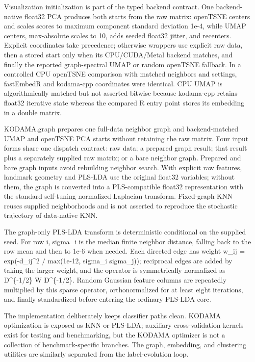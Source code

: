 \documentclass[twoside,11pt]{article}
\begin{document}
\begin{small}
Visualization initialization is part of the typed backend contract. One backend-native float32 PCA produces both starts from the raw matrix: openTSNE centers and scales scores to maximum component standard deviation 1e-4, while UMAP centers, max-absolute scales to 10, adds seeded float32 jitter, and recenters. Explicit coordinates take precedence; otherwise wrappers use explicit raw data, then a stored start only when its CPU/CUDA/Metal backend matches, and finally the reported graph-spectral UMAP or random openTSNE fallback. In a controlled CPU openTSNE comparison with matched neighbors and settings, fastEmbedR and kodama-cpp coordinates were identical. CPU UMAP is algorithmically matched but not asserted bitwise because kodama-cpp retains float32 iterative state whereas the compared R entry point stores its embedding in a double matrix.

KODAMA.graph prepares one full-data neighbor graph and backend-matched UMAP and openTSNE PCA starts without retaining the raw matrix. Four input forms share one dispatch contract: raw data; a prepared graph result; that result plus a separately supplied raw matrix; or a bare neighbor graph. Prepared and bare graph inputs avoid rebuilding neighbor search. With explicit raw features, landmark geometry and PLS-LDA use the original float32 variables; without them, the graph is converted into a PLS-compatible float32 representation with the standard self-tuning normalized Laplacian transform. Fixed-graph KNN reuses supplied neighborhoods and is not asserted to reproduce the stochastic trajectory of data-native KNN.

The graph-only PLS-LDA transform is deterministic conditional on the supplied seed. For row i, sigma\_i is the median finite neighbor distance, falling back to the row mean and then to 1e-6 when needed. Each directed edge has weight w\_ij = exp(-d\_ij\textasciicircum{}2 / max(1e-12, sigma\_i sigma\_j)); reciprocal edges are added by taking the larger weight, and the operator is symmetrically normalized as D\textasciicircum{}\{-1/2\} W D\textasciicircum{}\{-1/2\}. Random Gaussian feature columns are repeatedly multiplied by this sparse operator, orthonormalized for at least eight iterations, and finally standardized before entering the ordinary PLS-LDA core.

The implementation deliberately keeps classifier paths clean. KODAMA optimization is exposed as KNN or PLS-LDA; auxiliary cross-validation kernels exist for testing and benchmarking, but the KODAMA optimizer is not a collection of benchmark-specific branches. The graph, embedding, and clustering utilities are similarly separated from the label-evolution loop.


\end{small}
\end{document}
